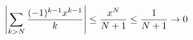 \documentclass[preview]{standalone}
\begin{document}
\begin{align*}
\special{dvisvgm:raw <g id='unique000'>}\left|\displaystyle\sum_{k>N}\dfrac{(-1)^{k-1}x^{k-1}}{k}\right|\le\dfrac{x^N}{N+1}\le\dfrac{1}{N+1}\to 0\special{dvisvgm:raw </g>}
\end{align*}
\end{document}
